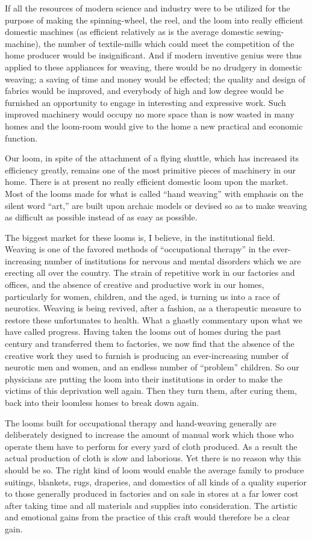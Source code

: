\documentclass{book}
\begin{document}
If all the resources of modern science and industry were to be utilized for the purpose of making the spinning-wheel, the reel, and the loom into really efficient domestic machines (as efficient relatively as is the average domestic sewing-machine), the number of textile-mills which could meet the competition of the home producer would be insignificant. And if modern inventive genius were thus applied to these appliances for weaving, there would be no drudgery in domestic weaving; a saving of time and money would be effected; the quality and design of fabrics would be improved, and everybody of high and low degree would be furnished an opportunity to engage in interesting and expressive work. Such improved machinery would occupy no more space than is now wasted in many homes and the loom-room would give to the home a new practical and economic function.

Our loom, in spite of the attachment of a flying shuttle, which has increased its efficiency greatly, remains one of the most primitive pieces of machinery in our home. There is at present no really efficient domestic loom upon the market. Most of the looms made for what is called “hand weaving” with emphasis on the silent word “art,” are built upon archaic models or devised so as to make weaving as difficult as possible instead of as easy as possible.

The biggest market for these looms is, I believe, in the institutional field. Weaving is one of the favored methods of “occupational therapy” in the ever-increasing number of institutions for nervous and mental disorders which we are erecting all over the country. The strain of repetitive work in our factories and offices, and the absence of creative and productive work in our homes, particularly for women, children, and the aged, is turning us into a race of neurotics. Weaving is being revived, after a fashion, as a therapeutic measure to restore these unfortunates to health. What a ghastly commentary upon what we have called progress. Having taken the looms out of homes during the past century and transferred them to factories, we now find that the absence of the creative work they used to furnish is producing an ever-increasing number of neurotic men and women, and an endless number of “problem” children. So our physicians are putting the loom into their institutions in order to make the victims of this deprivation well again. Then they turn them, after curing them, back into their loomless homes to break down again.

The looms built for occupational therapy and hand-weaving generally are deliberately designed to increase the amount of manual work which those who operate them have to perform for every yard of cloth produced. As a result the actual production of cloth is slow and laborious. Yet there is no reason why this should be so. The right kind of loom would enable the average family to produce suitings, blankets, rugs, draperies, and domestics of all kinds of a quality superior to those generally produced in factories and on sale in stores at a far lower cost after taking time and all materials and supplies into consideration. The artistic and emotional gains from the practice of this craft would therefore be a clear gain.
\end{document}
